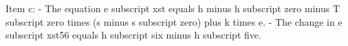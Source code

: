 Item c:
- The equation e subscript xst equals h minus h subscript zero minus T subscript zero times (s minus s subscript zero) plus k times e.
- The change in e subscript xst56 equals h subscript six minus h subscript five.